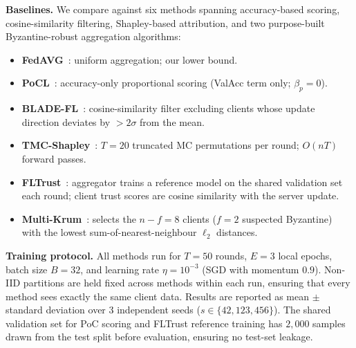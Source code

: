 \documentclass[journal]{IEEEtran}
\theoremstyle{definition}
\theoremstyle{remark}
\begin{document}
\textbf{Baselines.}
We compare against six methods spanning accuracy-based scoring,
cosine-similarity filtering, Shapley-based attribution, and two
purpose-built Byzantine-robust aggregation algorithms:
\begin{itemize}
  \item \textbf{FedAVG}~\cite{mcmahan2017communication}: uniform
        aggregation; our lower bound.
  \item \textbf{PoCL}~\cite{pocl2024}: accuracy-only proportional
        scoring (ValAcc term only; $\beta_p{=}0$).
  \item \textbf{BLADE-FL}~\cite{bladefl2022}: cosine-similarity filter
        excluding clients whose update direction deviates by
        $>2\sigma$ from the mean.
  \item \textbf{TMC-Shapley}~\cite{ghorbani2019data}: $T{=}20$
        truncated MC permutations per round; $O(nT)$ forward passes.
  \item \textbf{FLTrust}~\cite{cao2020fltrust}: aggregator trains a
        reference model on the shared validation set each round;
        client trust scores are cosine similarity with the server
        update.
  \item \textbf{Multi-Krum}~\cite{blanchard2017krum}: selects the
        $n{-}f{=}8$ clients ($f{=}2$ suspected Byzantine) with the
        lowest sum-of-nearest-neighbour $\ell_2$ distances.
\end{itemize}

\textbf{Training protocol.}
All methods run for $T{=}50$ rounds, $E{=}3$ local epochs, batch
size $B{=}32$, and learning rate $\eta{=}10^{-3}$ (SGD with momentum
$0.9$).
Non-IID partitions are held fixed across methods within each run,
ensuring that every method sees exactly the same client data.
Results are reported as mean $\pm$ standard deviation over 3
independent seeds ($s \in \{42, 123, 456\}$).
The shared validation set for PoC scoring and FLTrust reference
training has $2{,}000$ samples drawn from the test split before
evaluation, ensuring no test-set leakage.
\end{document}
